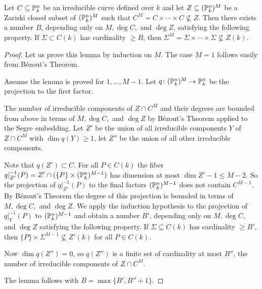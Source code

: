 \begin{lemma}\label{LemmaNAlon} 
  Let $C \subseteq {\mathbb{P}}_k^n$ be an
  irreducible curve defined over $k$ and let $Z \subseteq ({\mathbb{P}}_k^n)^M$
  be a Zariski closed subset of $({\mathbb{P}}_k^n)^M$ such that $C^M = C \times
  \cdots \times C \not\subseteq Z$. Then there exists a number $B$,
  depending only on $M, \deg C,$ and $\deg Z$, satisfying the following
  property. If $\Sigma \subset C(k)$ has cardinality $\ge B$, then
  $\Sigma^M = \Sigma \times \cdots \times \Sigma \not\subseteq Z(k)$.
\end{lemma}
\begin{proof}%
  Let us prove this lemma by induction on $M$. The case $M = 1$ follows
  easily from B\'{e}zout's Theorem.

  Assume the lemma is proved for $1, \ldots, M-1$. Let $q \colon
  ({\mathbb{P}}_k^n)^M \rightarrow {\mathbb{P}}_k^n$ be the projection to the first
  factor.

  The number of irreducible components of $Z \cap C^M$ and their degrees
  are bounded from above in terms of $M,\deg C,$ and $\deg Z$ by
  B\'ezout's Theorem applied to the Segre embedding.
  Let $Z'$ be the union of all  irreducible
  components $Y$ of $Z \cap C^M$ with $\dim q(Y)\ge 1$, let $Z''$ be the
  union of all other irreducible components.

  Note that $q(Z')\subset C$. For all $P \in C(k)$ the fiber
  $q|_{Z'}^{-1}(P)=Z'\cap (\{P\}\times ({\mathbb{P}}_k^n)^{M-1})$ has
  dimension at most
  $\dim Z'-1\le M-2$. So the projection of $q|_{Z'}^{-1}(P)$ to the final
  factors $({\mathbb{P}}_k^n)^{M-1}$ does not contain $C^{M-1}$. By B\'ezout's
  Theorem the degree of this projection is bounded in terms of $M,\deg
  C,$ and $\deg Z$. We apply the induction hypothesis to the projection
  of $q|_Y^{-1}(P)$ to $({\mathbb{P}}_k^n)^{M-1}$ and obtain a number $B'$,
  depending only on $M,\deg C,$ and $\deg Z$ satisfying the following
  property. If $\Sigma \subseteq C(k)$ has cardinality $\ge B'$, then
  $\{P\} \times \Sigma^{M-1} \not\subseteq Z'(k)$ for all $P \in C(k)$.

  Now $\dim q(Z'') = 0$, so $q(Z'')$ is a finite set of cardinality
  at most $B''$, the number of irreducible components of
  $Z\cap C^M$. 

  The lemma follows with $B=\max\{B',B''+1\}$.  
\end{proof}

